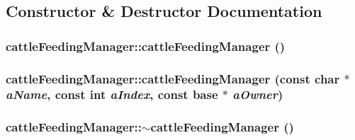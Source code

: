 \subsection{Constructor \& Destructor Documentation}
\hypertarget{classcattle_feeding_manager_ae91c55982c67f8bc983c545c2a624ce7}{
\subsubsection[{cattleFeedingManager}]{\setlength{\rightskip}{0pt plus 5cm}cattleFeedingManager::cattleFeedingManager ()}}
\label{classcattle_feeding_manager_ae91c55982c67f8bc983c545c2a624ce7}
\hypertarget{classcattle_feeding_manager_aa1efdcaac1a2b1a6f5247287a8d3232d}{
\subsubsection[{cattleFeedingManager}]{\setlength{\rightskip}{0pt plus 5cm}cattleFeedingManager::cattleFeedingManager (const char $\ast$ {\em aName}, \/  const int {\em aIndex}, \/  const {\bf base} $\ast$ {\em aOwner})}}
\label{classcattle_feeding_manager_aa1efdcaac1a2b1a6f5247287a8d3232d}
\hypertarget{classcattle_feeding_manager_a25bfea6e392a7097acfaafbdda189ff2}{
\subsubsection[{$\sim$cattleFeedingManager}]{\setlength{\rightskip}{0pt plus 5cm}cattleFeedingManager::$\sim$cattleFeedingManager ()}}
\label{classcattle_feeding_manager_a25bfea6e392a7097acfaafbdda189ff2}


